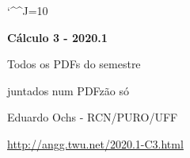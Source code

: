 \documentclass[oneside,12pt]{article}
\begin{document}

\def\drafturl{http://angg.twu.net/LATEX/2020-1-C3.pdf}
\def\drafturl{http://angg.twu.net/2020.1-C3.html}
\def\draftfooter{\tiny \href{\drafturl}{\jobname{}} \ColorBrown{\shorttoday{} \hours}}

\catcode`\^^J=10
\pu




%

\thispagestyle{empty}

\begin{center}

\vspace*{1.2cm}

{\bf \Large Cálculo 3 - 2020.1}

\bsk

Todos os PDFs do semestre

juntados num PDFzão só

\bsk

Eduardo Ochs - RCN/PURO/UFF

\url{http://angg.twu.net/2020.1-C3.html}

\end{center}

\newpage





\end{document}

